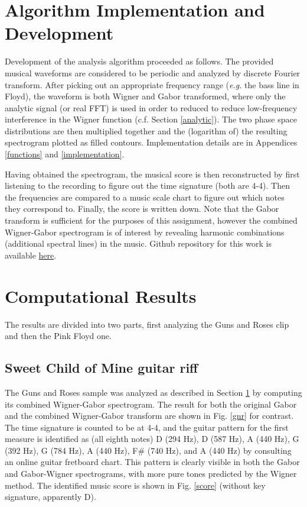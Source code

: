 \documentclass{article}
\begin{document}
\section{Algorithm Implementation and Development}\label{section}
Development of the analysis algorithm proceeded as follows. The provided musical waveforms are considered to be periodic and analyzed by discrete Fourier transform. After picking out an appropriate frequency range (\textit{e.g.} the bass line in Floyd), the waveform is both Wigner and Gabor transformed, where only the analytic signal (or real FFT) is used in order to reduced to reduce low-frequency interference in the Wigner function (c.f. Section \ref{analytic}). The two phase space distributions are then multiplied together and the (logarithm of) the resulting spectrogram plotted as filled contours. Implementation details are in Appendices \ref{functions} and \ref{implementation}.

Having obtained the spectrogram, the musical score is then reconstructed by first listening to the recording to figure out the time signature (both are 4-4). Then the frequencies are compared to a music scale chart to figure out which notes they correspond to. Finally, the score is written down. Note that the Gabor transform is sufficient for the purposes of this assignment, however the combined Wigner-Gabor spectrogram is of interest by revealing harmonic combinations (additional spectral lines) in the music. Github repository for this work is available \href{https://github.com/crewsdw/amath582}{here}.

\section{Computational Results}
The results are divided into two parts, first analyzing the Guns and Roses clip and then the Pink Floyd one.

\subsection{Sweet Child of Mine guitar riff}
The Guns and Roses sample was analyzed as described in Section \ref{section} by computing its combined Wigner-Gabor spectrogram. The result for both the original Gabor and the combined Wigner-Gabor transform are shown in Fig. \ref{gnr} for contrast. The time signature is counted to be at 4-4, and the guitar pattern for the first measure is identified as (all eighth notes) D (294 Hz), D (587 Hz), A (440 Hz), G (392 Hz), G (784 Hz), A (440 Hz), F\# (740 Hz), and A (440 Hz) by consulting an online guitar fretboard chart. This pattern is clearly visible in both the Gabor and Gabor-Wigner spectrograms, with more pure tones predicted by the Wigner method. The identified music score is shown in Fig. \ref{score} (without key signature, apparently D).
\end{document}
